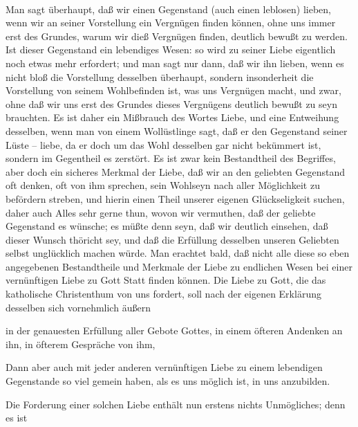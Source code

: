 \begin{aufza}
\begin{aufzb}
\end{aufzb}
\item {}\par
\begin{aufzb}
\item {}~\par
Man sagt überhaupt, daß wir einen Gegenstand (auch einen leblosen) lieben, wenn wir an seiner Vorstellung ein Vergnügen finden können, ohne uns immer erst des Grundes, warum wir dieß Vergnügen finden, deutlich bewußt zu werden. Ist dieser Gegenstand ein lebendiges Wesen: so wird zu seiner Liebe eigentlich noch etwas mehr erfordert; und man sagt nur dann, daß wir ihn lieben, wenn es nicht bloß die Vorstellung desselben überhaupt, sondern insonderheit die Vorstellung von seinem Wohlbefinden ist, was uns Vergnügen macht, und zwar, ohne daß wir uns erst des Grundes dieses Vergnügens deutlich bewußt zu seyn brauchten. Es ist daher ein Mißbrauch des Wortes Liebe, und eine Entweihung desselben, wenn man von einem Wollüstlinge sagt, daß er den Gegenstand seiner Lüste -- liebe, da er doch um das Wohl desselben gar nicht bekümmert ist, sondern im Gegentheil es zerstört. Es ist zwar kein Bestandtheil des Begriffes, aber doch ein sicheres Merkmal der Liebe, daß wir an den geliebten Gegenstand oft denken, oft von ihm sprechen, sein Wohlseyn nach aller Möglichkeit zu befördern streben, und hierin einen Theil unserer eigenen Glückseligkeit suchen, daher auch Alles sehr gerne thun, wovon wir vermuthen, daß der geliebte Gegenstand es wünsche; es müßte denn seyn, daß wir deutlich einsehen, daß dieser Wunsch thöricht sey, und daß die Erfüllung desselben unseren Geliebten selbst unglücklich machen würde. Man erachtet bald, daß nicht alle diese so eben angegebenen Bestandtheile und Merkmale der Liebe zu endlichen Wesen bei einer vernünftigen Liebe zu Gott Statt finden können. Die Liebe zu Gott, die das katholische Christenthum von uns fordert, soll nach der eigenen Erklärung desselben sich vornehmlich äußern
\begin{aufzc}
\item in der genauesten Erfüllung aller Gebote Gottes, in einem öfteren Andenken an ihn, in öfterem Gespräche von ihm, \usw\
\item Dann aber auch mit jeder anderen vernünftigen Liebe zu einem lebendigen Gegenstande so viel gemein haben, als es uns möglich ist, in uns anzubilden.
\end{aufzc}
Die Forderung einer solchen Liebe enthält nun erstens nichts Unmögliches; denn es ist~

\end{aufzb}
\end{aufza}

